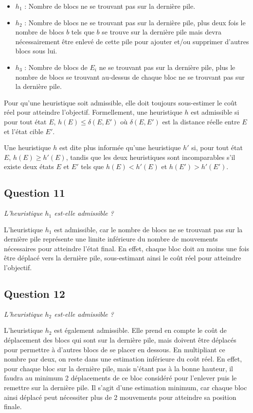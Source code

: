 \begin{itemize}
    \item $h_1$ : Nombre de blocs ne se trouvant pas sur la dernière pile.
    \item $h_2$ : Nombre de blocs ne se trouvant pas sur la dernière pile, plus deux fois le nombre de blocs $b$ tels que $b$ se trouve sur la dernière pile mais devra nécessairement être enlevé de cette pile pour ajouter et/ou supprimer d'autres blocs sous lui.
    \item $h_3$ : Nombre de blocs de $E_i$ ne se trouvant pas sur la dernière pile, plus le nombre de blocs se trouvant au-dessus de chaque bloc ne se trouvant pas sur la dernière pile.
\end{itemize}

Pour qu'une heuristique soit admissible, elle doit toujours sous-estimer le coût réel pour atteindre l'objectif. Formellement, une heuristique $h$ est admissible si pour tout état $E$, $h(E) \leq \delta (E, E')$ où $\delta (E, E')$ est la distance réelle entre $E$ et l'état cible $E'$.

Une heuristique $h$ est dite plus informée qu'une heuristique $h'$ si, pour tout état $E$, $h(E) \geq h'(E)$, tandis que les deux heuristiques sont incomparables s'il existe deux états $E$ et $E'$ tels que $h(E) < h'(E)$ et $h(E') > h'(E')$.

\subsection{Question 11}

\textit{L'heuristique $h_1$ est-elle admissible ?}

L'heuristique $h_1$ est admissible, car le nombre de blocs ne se trouvant pas sur la dernière pile représente une limite inférieure du nombre de mouvements nécessaires pour atteindre l'état final. En effet, chaque bloc doit au moins une fois être déplacé vers la dernière pile, sous-estimant ainsi le coût réel pour atteindre l'objectif.

\subsection{Question 12}

\textit{L'heuristique $h_2$ est-elle admissible ?}

L'heuristique $h_2$ est également admissible. Elle prend en compte le coût de déplacement des blocs qui sont sur la dernière pile, mais doivent être déplacés pour permettre à d'autres blocs de se placer en dessous. En multipliant ce nombre par deux, on reste dans une estimation inférieure du coût réel. En effet, pour chaque bloc sur la dernière pile, mais n'étant pas à la bonne hauteur, il faudra au minimum 2 déplacements de ce bloc considéré pour l'enlever puis le remettre sur la dernière pile. Il s'agit d'une estimation minimum, car chaque bloc ainsi déplacé peut nécessiter plus de 2 mouvements pour atteindre sa position finale.

